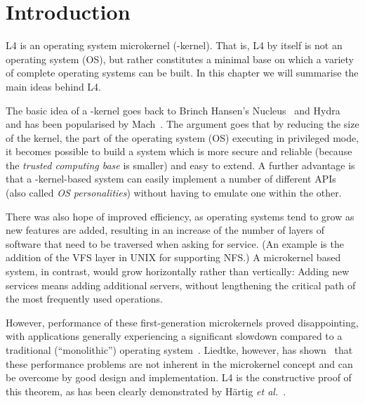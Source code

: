 %



\chapter{Introduction}

L4 is an operating system microkernel (\micro-kernel). That is, L4 by
itself is not an operating system (OS), but rather constitutes a minimal
base on which a variety of complete operating systems can be built. In
this chapter we will summarise the main ideas behind L4.

The basic idea of a \micro-kernel goes back to Brinch Hansen's
Nucleus~\cite{Brinch_Hansen_70} and Hydra~\cite{Wulf_CCJLPP_74} and has
been popularised by Mach~\cite{Rashid_TYGBBBC_88}. The argument goes
that by reducing the size of the kernel, the part of the operating
system (OS) executing in privileged mode, it becomes possible to build a
system which is more secure and reliable (because the \emph{trusted
computing base} is smaller) and easy to extend. A further advantage is
that a
\micro-kernel-based system can easily implement a number of different
APIs (also called \emph{OS personalities}) without having to emulate one
within the other.

There was also hope of improved efficiency, as operating systems tend to
grow as new features are added, resulting in an increase of the number
of layers of software that need to be traversed when asking for
service. (An example is the addition of the VFS layer in UNIX for
supporting NFS.) A microkernel based system, in contrast, would grow
horizontally rather than vertically: Adding new services means adding
additional servers, without lengthening the critical path of the most
frequently used operations.

However, performance of these first-generation microkernels proved
disappointing, with applications generally experiencing a significant
slowdown compared to a traditional (``monolithic'') operating
system~\cite{Chen_Bershad_93}. Liedtke, however, has
shown~\cite{Liedtke_93, Liedtke_95, Liedtke_96} that these performance
problems are not inherent in the microkernel concept and can be overcome
by good design and implementation. L4 is the constructive proof of this
theorem, as has been clearly demonstrated by H\"artig \emph{et
al.}~\cite{Hartig_HLSW_97}.


